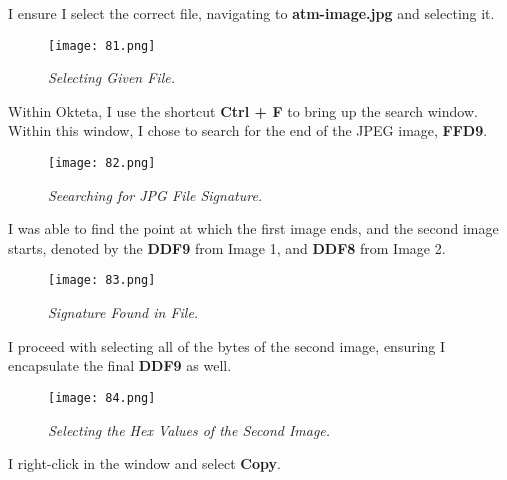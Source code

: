 I ensure I select the correct file, navigating to \textbf{atm-image.jpg} and selecting it.

\begin{figure}[H]
    \setlength{\abovecaptionskip}{20pt}
    \setlength{\belowcaptionskip}{0pt}
    \centering
    \texttt{[image: 81.png]}
    \captionsetup{justification=centering}
    \caption{\textit{Selecting Given File.}}
    \label{fig:81}
\end{figure}
\vspace{-10pt}

Within Okteta, I use the shortcut \textbf{Ctrl + F} to bring up the search window. Within this window, I chose to search for the end of the JPEG image, \textbf{FFD9}.

\begin{figure}[H]
    \setlength{\abovecaptionskip}{20pt}
    \setlength{\belowcaptionskip}{0pt}
    \centering
    \texttt{[image: 82.png]}
    \captionsetup{justification=centering}
    \caption{\textit{Seearching for JPG File Signature.}}
    \label{fig:82}
\end{figure}
\vspace{-10pt}

I was able to find the point at which the first image ends, and the second image starts, denoted by the \textbf{DDF9} from Image 1, and \textbf{DDF8} from Image 2.

\begin{figure}[H]
    \setlength{\abovecaptionskip}{20pt}
    \setlength{\belowcaptionskip}{0pt}
    \centering
    \texttt{[image: 83.png]}
    \captionsetup{justification=centering}
    \caption{\textit{Signature Found in File.}}
    \label{fig:83}
\end{figure}
\vspace{-10pt}

I proceed with selecting all of the bytes of the second image, ensuring I encapsulate the final \textbf{DDF9} as well.

\begin{figure}[H]
    \setlength{\abovecaptionskip}{20pt}
    \setlength{\belowcaptionskip}{0pt}
    \centering
    \texttt{[image: 84.png]}
    \captionsetup{justification=centering}
    \caption{\textit{Selecting the Hex Values of the Second Image.}}
    \label{fig:84}
\end{figure}
\vspace{-10pt}

I right-click in the window and select \textbf{Copy}.

